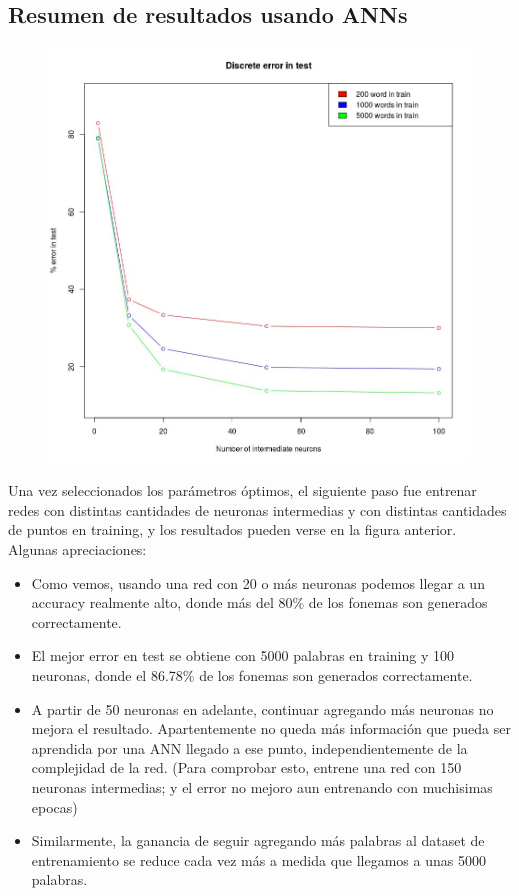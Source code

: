 \documentclass[paper=a4, fontsize=11pt]{scrartcl} %
\numberwithin{equation}{section} %
\numberwithin{figure}{section} %
\numberwithin{table}{section} %
\begin{document}
\subsection{Resumen de resultados usando ANNs}

\begin{figure}[h!]
\centering
\includegraphics[width=112mm]{annresults.jpg}
\end{figure}

Una vez seleccionados los parámetros óptimos, el siguiente paso fue entrenar redes con distintas cantidades de neuronas intermedias y con distintas cantidades de puntos en training, y los resultados pueden verse en la figura anterior. \\

Algunas apreciaciones:

\begin{itemize}
\item Como vemos, usando una red con 20 o más neuronas podemos llegar a un accuracy realmente alto, donde más del 80\% de los fonemas son generados correctamente.
\item El mejor error en test se obtiene con 5000 palabras en training y 100 neuronas, donde el 86.78\% de los fonemas son generados correctamente.
\item A partir de 50 neuronas en adelante, continuar agregando más neuronas no mejora el resultado. Apartentemente no queda más información que pueda ser aprendida por una ANN llegado a ese punto, independientemente de la complejidad de la red. (Para comprobar esto, entrene una red con 150 neuronas intermedias; y el error no mejoro aun entrenando con muchisimas epocas)
\item Similarmente, la ganancia de seguir agregando más palabras al dataset de entrenamiento se reduce cada vez más a medida que llegamos a unas 5000 palabras. 
\end{itemize}
\end{document}
